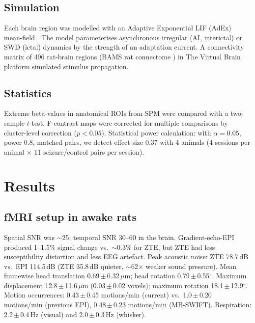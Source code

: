 \documentclass[11pt]{article}
\begin{document}
\subsection{Simulation}
Each brain region was modelled with an Adaptive Exponential LIF (AdEx) mean-field \citep{divolo2019}. The model parameterises asynchronous irregular (AI, interictal) or SWD (ictal) dynamics by the strength of an adaptation current. A connectivity matrix of 496 rat-brain regions (BAMS rat connectome \citep{bota2012}) in The Virtual Brain platform \citep{sanzleon2015} simulated stimulus propagation.

\subsection{Statistics}
Extreme beta-values in anatomical ROIs from SPM were compared with a two-sample $t$-test. F-contrast maps were corrected for multiple comparisons by cluster-level correction ($p<0.05$). Statistical power calculation: with $\alpha=0.05$, power 0.8, matched pairs, we detect effect size 0.37 with 4 animals (4 sessions per animal $\times$ 11 seizure/control pairs per session).

\section{Results}
\subsection{fMRI setup in awake rats}
Spatial SNR was $\sim$25; temporal SNR 30--60 in the brain. Gradient-echo-EPI produced 1--1.5\% signal change vs.\ $\sim$0.3\% for ZTE, but ZTE had less susceptibility distortion and less EEG artefact. Peak acoustic noise: ZTE 78.7\,dB vs.\ EPI 114.5\,dB (ZTE 35.8\,dB quieter, $\sim$62$\times$ weaker sound pressure). Mean framewise head translation 0.69\,$\pm$\,0.32\,$\mu$m; head rotation 0.79\,$\pm$\,0.55$^\circ$. Maximum displacement 12.8\,$\pm$\,11.6\,$\mu$m (0.03\,$\pm$\,0.02 voxels); maximum rotation 18.1\,$\pm$\,12.9$^\circ$. Motion occurrences: 0.43\,$\pm$\,0.45 motions/min (current) vs.\ 1.0\,$\pm$\,0.20 motions/min (previous EPI), 0.48\,$\pm$\,0.23 motions/min (MB-SWIFT). Respiration: 2.2\,$\pm$\,0.4\,Hz (visual) and 2.0\,$\pm$\,0.3\,Hz (whisker).
\end{document}
